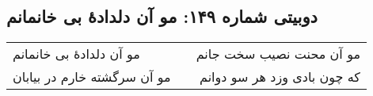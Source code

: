 \begin{center}
\section*{دوبیتی شماره ۱۴۹: مو آن دلدادهٔ بی خانمانم}
\label{sec:149}
\begin{longtable}{l p{0.5cm} r}
مو آن دلدادهٔ بی خانمانم
&&
مو آن محنت نصیب سخت جانم
\\
مو آن سرگشته خارم در بیابان
&&
که چون بادی وزد هر سو دوانم
\\
\end{longtable}
\end{center}
